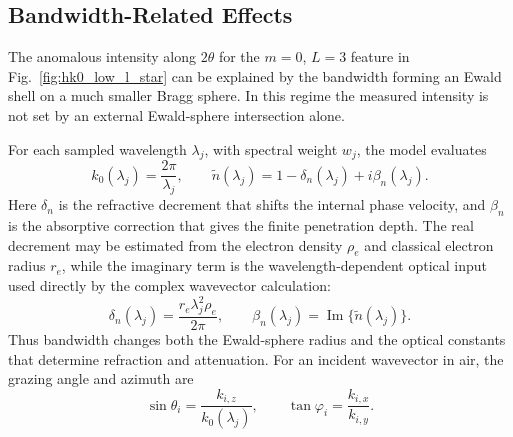 \subsection{Bandwidth-Related Effects}
\label{sec:correlated_effects}
\label{sec:refraction}
\label{sec:bandwidth_mosaic_cap}

The anomalous intensity along \(2\theta\) for the \(m=0\), \(L=3\) feature in Fig.~\ref{fig:hk0_low_l_star} can be explained by the bandwidth forming an Ewald shell on a much smaller Bragg sphere. In this
regime the measured intensity is not set by an external Ewald-sphere
intersection alone. 

For each sampled wavelength
\(\lambda_j\), with spectral weight \(w_j\), the model evaluates
\begin{equation}
  k_0(\lambda_j)=\frac{2\pi}{\lambda_j},
  \qquad
  \tilde n(\lambda_j)
  =
  1-\delta_n(\lambda_j)+i\beta_n(\lambda_j).
  \label{eq:n_complex_lambda_main}
\end{equation}
Here \(\delta_n\) is the refractive decrement that shifts the internal phase
velocity, and \(\beta_n\) is the absorptive correction that gives the finite
penetration depth. The real decrement may be estimated from the electron
density \(\rho_e\) and classical electron radius \(r_e\), while the imaginary
term is the wavelength-dependent optical input used directly by the complex
wavevector calculation:
\begin{equation}
  \delta_n(\lambda_j)
  =
  \frac{r_e\lambda_j^2\rho_e}{2\pi},
  \qquad
  \beta_n(\lambda_j)
  =
  \operatorname{Im}\{\tilde n(\lambda_j)\}.
  \label{eq:delta_beta_lambda_main}
\end{equation}
Thus bandwidth changes both the Ewald-sphere radius and the optical constants
that determine refraction and attenuation.
For an incident wavevector in air, the grazing angle and azimuth are
\begin{equation}
  \sin\theta_i
  =
  \frac{k_{i,z}}{k_0(\lambda_j)},
  \qquad
  \tan\varphi_i
  =
  \frac{k_{i,x}}{k_{i,y}}.
  \label{eq:incident_angles_lambda_main}
\end{equation}

